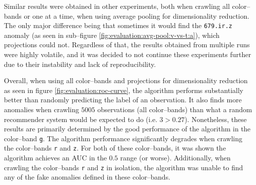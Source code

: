 Similar results were obtained in other experiments, both when crawling all \panstarrs color--bands or one at a time, when using average pooling for dimensionality reduction. The only major difference being that sometimes it would find the \texttt{679.ir.z} anomaly (as seen in sub--figure \ref{fig:evaluation:avg-pool:v-vs-t:a}), which projections could not. Regardless of that, the results obtained from multiple runs were highly volatile, and it was decided to not continue these experiments further due to their instability and lack of reproducibility. \newline

Overall, when using all \panstarrs color--bands and projections for dimensionality reduction as seen in figure \ref{fig:evaluation:roc-curve}, the \mlblink algorithm performs substantially better than randomly predicting the label of an observation. It also finds more anomalies when crawling $5005$ observations (all \panstarrs color--bands) than what a random recommender system would be expected to do (i.e. $3 > 0.27$). Nonetheless, these results are primarily determined by the good performance of the \mlblink algorithm in the \panstarrs color--band \texttt{g}. The \mlblink algorithm performance significantly degrades when crawling the \panstarrs color--bands \texttt{r} and \texttt{z}. For both of these color--bands, it was shown the \mlblink algorithm achieves an AUC in the $0.5$ range (or worse). Additionally, when crawling the \panstarrs color--bands \texttt{r} and \texttt{z} in isolation, the \mlblink algorithm was unable to find any of the fake anomalies defined in these color--bands.
